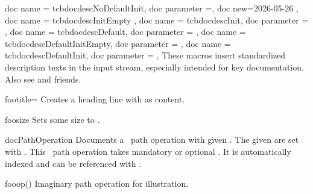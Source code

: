 \clearpage
\begin{docCommands}
  {
    { doc name = tcbdocdescNoDefaultInit, doc parameter =, doc new=2026-05-26 },
    { doc name = tcbdocdescInitEmpty },
    { doc name = tcbdocdescInit, doc parameter =  },
    { doc name = tcbdocdescDefault, doc parameter =  },
    { doc name = tcbdocdescDefaultInitEmpty, doc parameter =  },
    { doc name = tcbdocdescDefaultInit, doc parameter =  },
  }
These macros insert standardized description texts in the input stream,
especially intended for key documentation.
Also see  and friends.

\begin{dispExample}
\tcbdocdescNoDefaultInit       \par
\tcbdocdescInitEmpty           \par
{}             \par
{}          \par
{} \par
{}

\begin{docKey}[foo]{footitle}{=}{\tcbdocdescInitEmpty}
  Creates a heading line with  as content.
\end{docKey}

\begin{docKey}[foo]{foosize}{}{\tcbdocdescDefaultInit{10cm}{3cm}}
  Sets some size to .
\end{docKey}
\end{dispExample}
\end{docCommands}


\clearpage
\begin{docEnvironment}[doclang/environment content=operation description,
    doc new and updated={2019-09-18}{2020-04-22}]{docPathOperation}{}
  Documents a \tikzname\ path operation with given .
  The given  are set with .
  This \tikzname\ path operation takes mandatory or optional .
  It is automatically indexed and can be referenced with
  .
\begin{dispExample}
\begin{docPathOperation}{fooop}{()}
  Imaginary path operation for illustration.
\end{docPathOperation}
\end{dispExample}
\end{docEnvironment}


